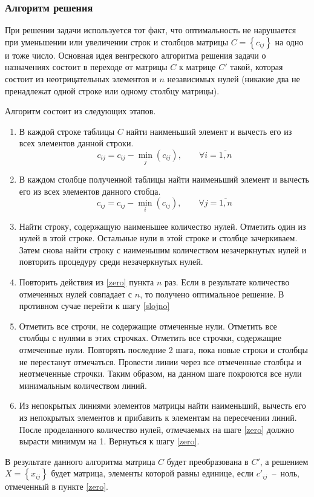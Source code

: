 \documentclass[14pt,a4paper]{extarticle}
\begin{document}
\subsubsection*{Алгоритм решения}
При решении задачи используется тот факт, что оптимальность не нарушается при уменьшении или увеличении строк и столбцов матрицы $C = \left\{c_{ij}\right\}$ на одно и тоже число. Основная идея венгреского алгоритма решения задачи о назначениях состоит в переходе от матрицы $C$ к матрице $C'$ такой, которая состоит из неотрицательных элементов и $n$ независимых нулей (никакие два не пренадлежат одной строке или одному столбцу матрицы). 

Алгоритм состоит из следующих этапов\cite{Hungarian}.
\begin{enumerate}

\item В каждой строке таблицы $C$ найти наименьший элемент и вычесть его из всех элементов данной строки.
\begin{equation}
c_{ij} = c_{ij} - \min_j (c_{ij}), \qquad \forall i = \overline{1,n}
\end{equation}

\item В каждом столбце полученной таблицы найти наименьший элемент и вычесть его из всех элементов данного стобца.
\begin{equation}
c_{ij} = c_{ij} - \min_i (c_{ij}), \qquad \forall j = \overline{1,n}
\end{equation}

\item \label{zero} Найти строку, содержащую наименьшее количество нулей. Отметить один из нулей в этой строке. Остальные нули в этой строке и столбце зачеркиваем. Затем снова найти строку с наименьшим количеством незачеркнутых нулей и повторить процедуру среди незачеркнутых нулей.
\item Повторить действия из \ref{zero} пункта $n$ раз. Если в результате количество отмеченных нулей совпадает с $n$, то получено оптимальное решение. В противном сучае перейти к шагу \ref{slojno}

\item \label{slojno} Отметить все строчи, не содержащие отмеченные нули. Отметить все столбцы с нулями в этих строчках. Отметить все строчки, содержащие отмеченные нули. Повторять последние 2 шага, пока новые строки и столбцы не перестанут отмечаться. Провести линии через все отмеченные столбцы и неотмеченные строчки. Таким образом, на данном шаге покроются все нули минимальным количеством линий.

\item Из непокрытых линиями элементов матрицы найти наименьший, вычесть его из непокрытых элементов и прибавить к элементам на пересечении линий. После проделанного количество нулей, отмечаемых на шаге \ref{zero} должно вырасти минимум на 1. Вернуться к шагу \ref{zero}.
\end{enumerate}
В результате данного алгоритма матрица $C$ будет преобразована в $C'$, а решением $X = \left\{x_{ij}\right\}$ будет матрица, элементы которой равны единице, если $c'_{ij}$~--~ноль, отмеченный в пункте \ref{zero}.
\end{document}
